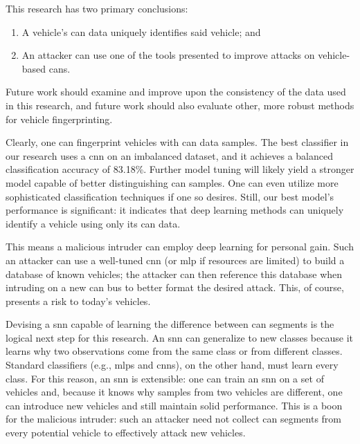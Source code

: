 \documentclass[../main.tex]{subfiles}
\begin{document}

This research has two primary conclusions:

\begin{enumerate}
    \item A vehicle's \ac{can} data uniquely identifies said vehicle; and
    \item An attacker can use one of the tools presented to improve attacks on vehicle-based \aclp{can}.
\end{enumerate}

\noindent Future work should examine and improve upon the consistency of the data used in this research, and future work should also evaluate other, more robust methods for vehicle fingerprinting.


Clearly, one can fingerprint vehicles with \ac{can} data samples. The best classifier in our research uses a \acl{cnn} on an imbalanced dataset, and it achieves a balanced classification accuracy of 83.18\%. Further model tuning will likely yield a stronger model capable of better distinguishing \ac{can} samples. One can even utilize more sophisticated classification techniques if one so desires. Still, our best model's performance is significant: it indicates that deep learning methods can uniquely identify a vehicle using only its \ac{can} data.

This means a malicious intruder can employ deep learning for personal gain. Such an attacker can use a well-tuned \ac{cnn} (or \ac{mlp} if resources are limited) to build a database of known vehicles; the attacker can then reference this database when intruding on a new \acl{can} bus to better format the desired attack. This, of course, presents a risk to today's vehicles.


Devising a \ac{snn} capable of learning the difference between \ac{can} segments is the logical next step for this research. An \ac{snn} can generalize to new classes because it learns why two observations come from the same class or from different classes. Standard classifiers (e.g., \acp{mlp} and \acp{cnn}), on the other hand, must learn every class. For this reason, an \ac{snn} is extensible: one can train an \ac{snn} on a set of vehicles and, because it knows why samples from two vehicles are different, one can introduce new vehicles and still maintain solid performance. This is a boon for the malicious intruder: such an attacker need not collect \ac{can} segments from every potential vehicle to effectively attack new vehicles.
\end{document}

